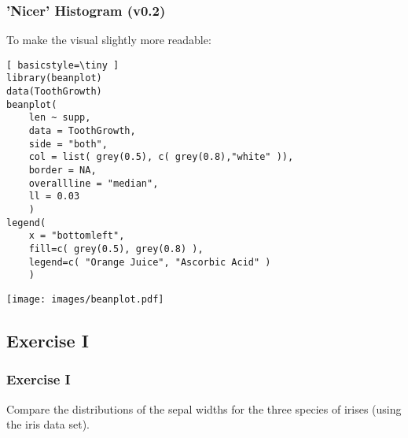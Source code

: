 \begin{frame}
\frametitle{'Nicer' Histogram (v0.2)}
To make the visual slightly more readable:

	\begin{lstlisting}[ basicstyle=\tiny ]
library(beanplot)
data(ToothGrowth)
beanplot(
	len ~ supp, 
	data = ToothGrowth, 
	side = "both", 
	col = list( grey(0.5), c( grey(0.8),"white" )), 
	border = NA, 
	overallline = "median", 
	ll = 0.03
	)
legend(
	x = "bottomleft",
	fill=c( grey(0.5), grey(0.8) ), 
	legend=c( "Orange Juice", "Ascorbic Acid" )
	)
	\end{lstlisting}
	
        \begin{center}
	         \texttt{[image: images/beanplot.pdf]}
        \end{center}
\end{frame}

%





\subsection{Exercise I}
\begin{frame}
	\frametitle{Exercise I}
	Compare the distributions of the sepal widths for the three species of irises (using the \ttfamily iris \normalfont data set).
\end{frame}